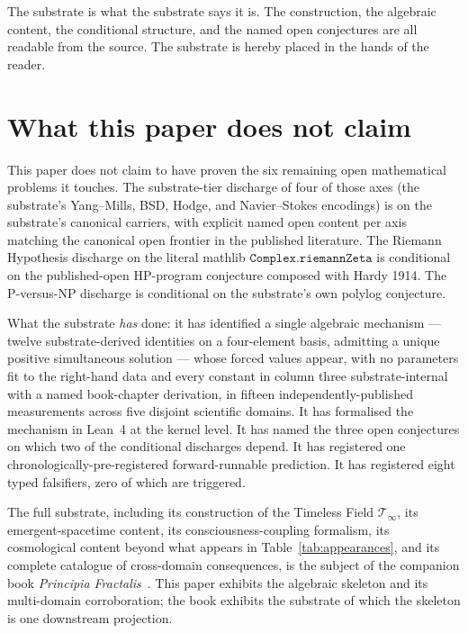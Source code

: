 \documentclass[11pt,a4paper]{amsart}
\theoremstyle{plain}
\theoremstyle{definition}
\begin{document}
The substrate is what the substrate says it is. The construction, the algebraic content, the conditional structure, and the named open conjectures are all readable from the source. The substrate is hereby placed in the hands of the reader.

\section{What this paper does not claim}

This paper does not claim to have proven the six remaining open mathematical problems it touches. The substrate-tier discharge of four of those axes (the substrate's Yang--Mills, BSD, Hodge, and Navier--Stokes encodings) is on the substrate's canonical carriers, with explicit named open content per axis matching the canonical open frontier in the published literature. The Riemann Hypothesis discharge on the literal mathlib $\texttt{Complex.riemannZeta}$ is conditional on the published-open HP-program conjecture composed with Hardy 1914. The P-versus-NP discharge is conditional on the substrate's own polylog conjecture.

What the substrate \emph{has} done: it has identified a single algebraic mechanism --- twelve substrate-derived identities on a four-element basis, admitting a unique positive simultaneous solution --- whose forced values appear, with no parameters fit to the right-hand data and every constant in column three substrate-internal with a named book-chapter derivation, in fifteen independently-published measurements across five disjoint scientific domains. It has formalised the mechanism in Lean~4 at the kernel level. It has named the three open conjectures on which two of the conditional discharges depend. It has registered one chronologically-pre-registered forward-runnable prediction. It has registered eight typed falsifiers, zero of which are triggered.

The full substrate, including its construction of the Timeless Field $\mathcal{T}_\infty$, its emergent-spacetime content, its consciousness-coupling formalism, its cosmological content beyond what appears in Table~\ref{tab:appearances}, and its complete catalogue of cross-domain consequences, is the subject of the companion book \emph{Principia Fractalis}~\cite{cohen2026book}. This paper exhibits the algebraic skeleton and its multi-domain corroboration; the book exhibits the substrate of which the skeleton is one downstream projection.

\appendix
\end{document}
